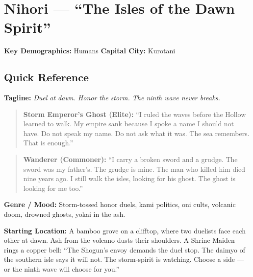 \section{Nihori --- ``The Isles of the Dawn Spirit''}
\label{chap:nihori}

\textbf{Key Demographics: } Humans
\textbf{Capital City: } Kurotani

\subsection*{Quick Reference}
\textbf{Tagline:} \textit{Duel at dawn. Honor the storm. The ninth wave never breaks.}

\begin{quote}
  \textbf{Storm Emperor's Ghost (Elite):}  
  ``I ruled the waves before the Hollow learned to walk. My empire sank because I spoke a name I should not have. Do not speak my name. Do not ask what it was. The sea remembers. That is enough.''
\end{quote}

\begin{quote}
  \textbf{Wanderer (Commoner):}  
  ``I carry a broken sword and a grudge. The sword was my father's. The grudge is mine. The man who killed him died nine years ago. I still walk the isles, looking for his ghost. The ghost is looking for me too.''
\end{quote}

\textbf{Genre / Mood:} Storm-tossed honor duels, kami politics, oni cults, volcanic doom, drowned ghosts, yokai in the ash.

\textbf{Starting Location:} A bamboo grove on a clifftop, where two duelists face each other at dawn. Ash from the volcano dusts their shoulders. A Shrine Maiden rings a copper bell: ``The Shogun's envoy demands the duel stop. The daimyo of the southern isle says it will not. The storm-spirit is watching. Choose a side --- or the ninth wave will choose for you.''

